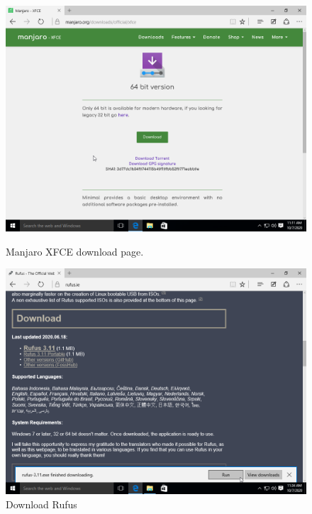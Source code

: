 \documentclass{article}
\begin{document}
\begin{figure}[ht!]
    \centering
    \begin{minipage}{0.5\textwidth}
        \includegraphics[width=.95\textwidth]{images/get_the_torrent_file.png}
        \caption{Manjaro XFCE download page.}%
        \label{fig:downloadPage}
    \end{minipage}\hfill
    \centering
    \begin{minipage}{0.5\textwidth}
        \includegraphics[width=.95\textwidth]{images/run_rufus.png}
        \caption{Download Rufus}%
        \label{fig:getRufus}
    \end{minipage}\hfill

\end{figure}
\end{document}
